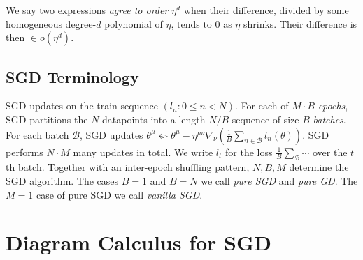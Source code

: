\documentclass{article}
\theoremstyle{plain}
\theoremstyle{definition}
\newcommand{\wrap}[1]{\left(#1\right)}
\newcommand{\Bb}{\mathcal{B}}
\begin{document}
        We say two expressions \emph{agree to order $\eta^d$} when
        their difference, divided by some homogeneous degree-$d$
        polynomial of $\eta$, tends to $0$ as $\eta$ shrinks.  Their
        difference is then $\in o(\eta^d)$.


    \subsection{SGD Terminology}
        SGD updates on the train sequence $(l_n: 0\leq n<N)$.
        For each of $M\cdot B$ \emph{epochs}, SGD partitions the $N$ datapoints
        into a length-$N/B$ sequence of size-$B$ \emph{batches}.  For each
        batch $\Bb$, SGD updates
        $
            \theta^\mu
            \leftsquigarrow
            \theta^\mu -
            \eta^{\mu\nu} \nabla_\nu
                \wrap{\frac{1}{B} \sum_{n\in \Bb} l_n(\theta)}
        $.
        SGD performs $N\cdot M$ many updates in total.  We write $l_t$ for the
        loss $\frac{1}{B}\sum_\Bb\cdots$ over the $t$th batch. 
        Together with an
        inter-epoch shuffling pattern, $N, B, M$ determine the SGD algorithm.
        The cases $B=1$ and $B=N$ we call \emph{pure SGD} and \emph{pure GD}.
        The $M=1$ case of pure SGD we call \emph{vanilla SGD}.


\section{Diagram Calculus for SGD} \label{sect:calculus}

\end{document}

